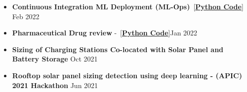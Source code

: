 \documentclass[10pt,letterpaper,roman]{moderncv} %
\begin{document}
\begin{itemize}
\begin{itemize}
		\item \textbf{Continuous Integration ML Deployment (ML-Ops)}~[\href{https://github.com/Hadi2525/ML_production_01/tree/Hadi2525-patch-1}{\textbf{Python Code}}] \hfill Feb 2022
%		
		\item \textbf{Pharmaceutical Drug review} -~[\href{https://github.com/Hadi2525/applied_ML/blob/master/Pharma/drug_model.ipynb}{\textbf{Python Code}}]\hfill Jan 2022
		\item  \textbf{Sizing of Charging Stations Co-located with Solar Panel and Battery Storage} \hfill Oct 2021
		\item \textbf{Rooftop solar panel sizing detection using deep learning -\textbf{ (APIC) 2021 Hackathon}} \hfill Jun 2021

\end{itemize}
\end{itemize}
\end{document}
